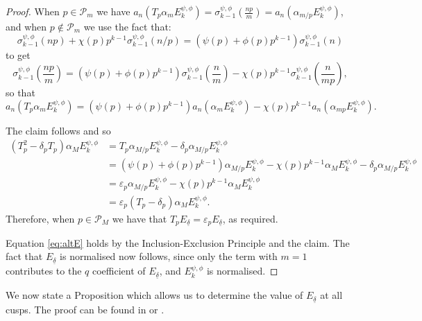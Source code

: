 \documentclass{amsart}
\theoremstyle{plain}
\theoremstyle{definition}
\begin{document}
\begin{proof}
\noindent When $p \in \mathcal{P}_m$ we have $a_n(T_p\alpha_m E_k^{\psi,\phi})=\sigma_{k-1}^{\psi,\phi}\left(\frac{np}{m}\right)=a_n(\alpha_{m/p}E_k^{\psi,\phi})$, and when $p\notin \mathcal{P}_m$ we use the fact that:
\begin{equation}
\label{eq:powerdiv}
    \sigma_{k-1}^{\psi,\phi}(np)+\chi(p)p^{k-1}\sigma_{k-1}^{\psi,\phi}(n/p) = (\psi(p)+\phi(p)p^{k-1})\sigma_{k-1}^{\psi,\phi}(n)
\end{equation}
to get
\begin{equation*}
    \sigma_{k-1}^{\psi,\phi}\left(\frac{np}{m}\right) = (\psi(p)+\phi(p)p^{k-1})\sigma_{k-1}^{\psi,\phi}\left(\frac{n}{m}\right)-\chi(p)p^{k-1}\sigma_{k-1}^{\psi,\phi}\left(\frac{n}{mp}\right),
\end{equation*}
so that 
\begin{equation*}
   a_n(T_p\alpha_m E_k^{\psi,\phi})=(\psi(p)+\phi(p)p^{k-1})a_n(\alpha_mE_k^{\psi,\phi})-\chi(p)p^{k-1}a_n(\alpha_{mp}E_k^{\psi,\phi}).
\end{equation*}

\noindent The claim follows and so
\begin{align*}
    (T_p^2-\delta_pT_p)\alpha_ME_k^{\psi,\phi} &= T_p\alpha_{M/p}E_k^{\psi,\phi} - \delta_p\alpha_{M/p}E_k^{\psi,\phi} \\
    &=(\psi(p)+\phi(p)p^{k-1})\alpha_{M/p}E_k^{\psi,\phi}-\chi(p)p^{k-1}\alpha_ME_k^{\psi,\phi} - \delta_p\alpha_{M/p}E_k^{\psi,\phi} \\
    &=\varepsilon_p\alpha_{M/p}E_k^{\psi,\phi} - \chi(p)p^{k-1}\alpha_ME_k^{\psi,\phi} \\
    &=\varepsilon_p(T_p-\delta_p)\alpha_M E_k^{\psi,\phi}.
\end{align*}
Therefore, when $p\in \mathcal{P}_M$ we have that $T_pE_{\underline{\delta}}=\varepsilon_pE_{\underline{\delta}}$, as required. 

Equation \eqref{eq:altE} holds by the Inclusion-Exclusion Principle and the claim. The fact that $E_{\underline{\delta}}$ is normalised now follows, since only the term with $m=1$ contributes to the $q$ coefficient of $E_{\underline{\delta}}$, and $E_k^{\psi,\phi}$ is normalised.
\end{proof}

We now state a Proposition which allows us to determine the value of $E_{\underline{\delta}}$ at all cusps. The proof can be found in \cite[Proposition 3.1.2]{spencer_2018} or \cite[Proposition 4]{billerey_menares_2017}.
\end{document}

